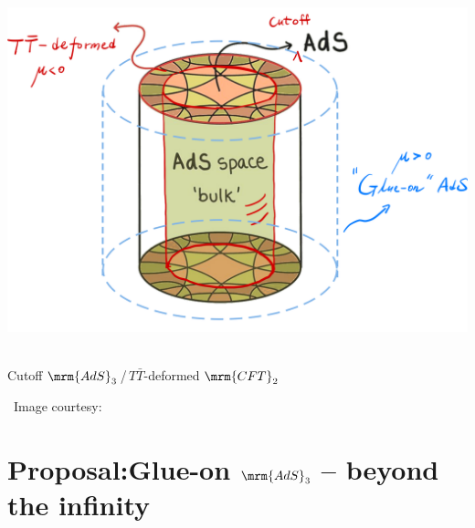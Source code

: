\documentclass[10pt]{article}
\newcommand{\citations}[1]{{\footnotesize#1\par}}
\newcommand{\TTbar}{\texorpdfstring{\ensuremath{T\bar{T}}}{TTbar}\xspace}
\begin{document}
\begin{multicols}{3}
\vspace*{-3.6\baselineskip}
\begin{center}
	\mbox{
		\hspace{-1.55em}
		\includegraphics[width=1.14\linewidth]{img/ads-cft-cutoff.png}
	}
	
	\vspace{-.8\baselineskip}\small
	Cutoff $\mrm{AdS}_3$\,/\,\TTbar-deformed $\mrm{CFT}_2$

	\vspace{-.3\baselineskip}
	\scriptsize\ Image courtesy: \textcite{AldegundePWSep22}
\end{center}


%
%
%
%

\vspace{-1.5\baselineskip}

\section*{\textbf{Proposal:}\texstringonly{\\}Glue-on $\mrm{AdS}_3$ -- beyond the infinity}
\label{se:glueonproposal}


\end{multicols}
\end{document}
